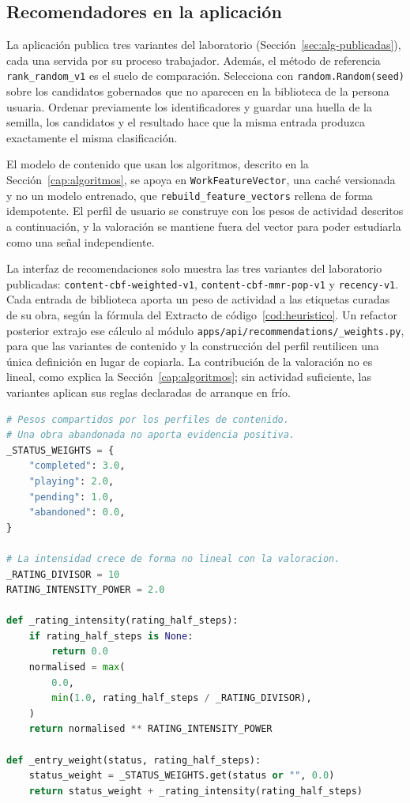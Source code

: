 \subsection{Recomendadores en la aplicación}\label{sec:impl-heuristico}

La aplicación publica tres variantes del laboratorio (Sección~\ref{sec:alg-publicadas}), cada una
servida por su proceso trabajador. Además, el método de referencia \texttt{rank\_random\_v1} es el suelo de
comparación. Selecciona con
\texttt{random.Random(seed)} sobre los candidatos gobernados que no aparecen en la biblioteca
de la persona usuaria. Ordenar previamente los identificadores y guardar una huella de la
semilla, los candidatos y el resultado hace que la misma entrada produzca exactamente el
misma clasificación.

El modelo de contenido que usan los algoritmos, descrito en la
Sección~\ref{cap:algoritmos}, se apoya en \texttt{WorkFeatureVector}, una caché versionada y
no un modelo entrenado, que \texttt{rebuild\_feature\_vectors} rellena de forma idempotente. El
perfil de usuario se construye con los pesos de actividad descritos a continuación, y la
valoración se mantiene fuera del vector para poder estudiarla como una señal independiente.

\begin{samepage}
La interfaz de recomendaciones solo muestra las tres variantes del laboratorio publicadas:
\texttt{content-cbf-weighted-v1}, \texttt{content-cbf-mmr-pop-v1} y \texttt{recency-v1}.
Cada entrada de biblioteca aporta un peso de actividad a las etiquetas curadas de su obra,
según la fórmula del Extracto de código~\ref{cod:heuristico}. Un refactor posterior extrajo ese
cálculo al módulo \texttt{apps/api/recommendations/\_weights.py}, para que las variantes de
contenido y la construcción del perfil reutilicen una única definición en lugar de copiarla. La
contribución de la valoración no es lineal, como explica la Sección~\ref{cap:algoritmos}; sin
actividad suficiente, las variantes aplican sus reglas declaradas de arranque en frío.

\begin{lstlisting}[language=Python, basicstyle=\small\ttfamily, caption={Cálculo del peso de actividad de una entrada de biblioteca.}, label={cod:heuristico}, captionpos=b]
# Pesos compartidos por los perfiles de contenido.
# Una obra abandonada no aporta evidencia positiva.
_STATUS_WEIGHTS = {
    "completed": 3.0,
    "playing": 2.0,
    "pending": 1.0,
    "abandoned": 0.0,
}

# La intensidad crece de forma no lineal con la valoracion.
_RATING_DIVISOR = 10
RATING_INTENSITY_POWER = 2.0

def _rating_intensity(rating_half_steps):
    if rating_half_steps is None:
        return 0.0
    normalised = max(
        0.0,
        min(1.0, rating_half_steps / _RATING_DIVISOR),
    )
    return normalised ** RATING_INTENSITY_POWER

def _entry_weight(status, rating_half_steps):
    status_weight = _STATUS_WEIGHTS.get(status or "", 0.0)
    return status_weight + _rating_intensity(rating_half_steps)
\end{lstlisting}
\end{samepage}

